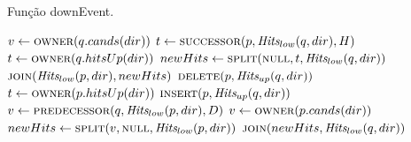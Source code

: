 \begin{algorithm}[H]
    \caption{Função downEvent.} \label{alg:par-cinetico:eventodown}
    \begin{algorithmic}[1]
                \State $v \leftarrow \Call{owner}{q.cands(dir)}$
                    \State {}
                \EndIf
                \State {}
                \State $t \leftarrow \Call{successor}{p, \Hits_{low}(q, dir), H}$
                    \State $t \leftarrow \Call{owner}{q.hitsUp(dir)}$
                \EndIf
                \State $newHits \leftarrow \Call{split}{\nnull, t, \Hits_{low}(q, dir)}$
                \State $\Call{join}{\Hits_{low}(p, dir), newHits}$
                \State $\Call{delete}{p, \Hits_{up}(q, dir)}$
                    \State {}
                \EndIf
            \Else
                    \State $t \leftarrow \Call{owner}{p.hitsUp(dir)}$
                        \State {}
                    \EndIf
                    \State $\Call{insert}{p, \Hits_{up}(q, dir)}$
                    \State $v \leftarrow \Call{predecessor}{q, \Hits_{low}(p, dir), D}$
                        \State $v \leftarrow \Call{owner}{p.cands(dir)}$
                    \EndIf
                    \State $newHits \leftarrow \Call{split}{v, \nnull, \Hits_{low}(p,dir)}$
                    \State $\Call{join}{newHits, \Hits_{low}(q, dir)}$
                    \State {}
                        \State {}
                    \EndIf
                \EndIf
            \EndIf
        \EndFunction
    \end{algorithmic}
\end{algorithm}